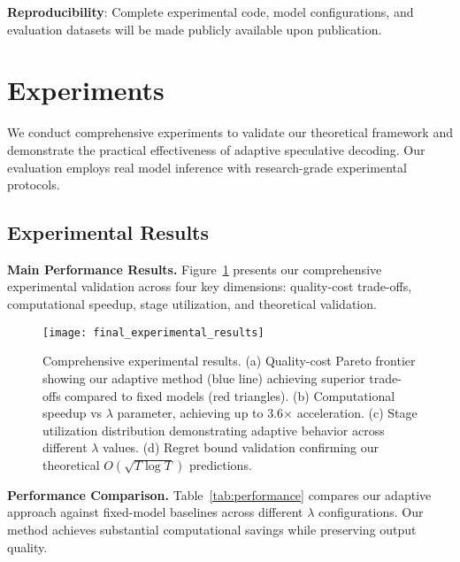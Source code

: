 \documentclass{article}
\theoremstyle{plain}
\theoremstyle{definition}
\theoremstyle{remark}
\begin{document}
\textbf{Reproducibility}: Complete experimental code, model configurations, and evaluation datasets will be made publicly available upon publication.

\section{Experiments}
\label{sec:experiments}

We conduct comprehensive experiments to validate our theoretical framework and demonstrate the practical effectiveness of adaptive speculative decoding. Our evaluation employs real model inference with research-grade experimental protocols.

\subsection{Experimental Results}

\textbf{Main Performance Results.} Figure~\ref{fig:main_results} presents our comprehensive experimental validation across four key dimensions: quality-cost trade-offs, computational speedup, stage utilization, and theoretical validation.

\begin{figure}[t]
\centering
\texttt{[image: final\_experimental\_results]}
\caption{Comprehensive experimental results. (a) Quality-cost Pareto frontier showing our adaptive method (blue line) achieving superior trade-offs compared to fixed models (red triangles). (b) Computational speedup vs $\lambda$ parameter, achieving up to 3.6× acceleration. (c) Stage utilization distribution demonstrating adaptive behavior across different $\lambda$ values. (d) Regret bound validation confirming our theoretical $O(\sqrt{T \log T})$ predictions.}
\label{fig:main_results}
\end{figure}

\textbf{Performance Comparison.} Table~\ref{tab:performance} compares our adaptive approach against fixed-model baselines across different $\lambda$ configurations. Our method achieves substantial computational savings while preserving output quality.
\end{document}
